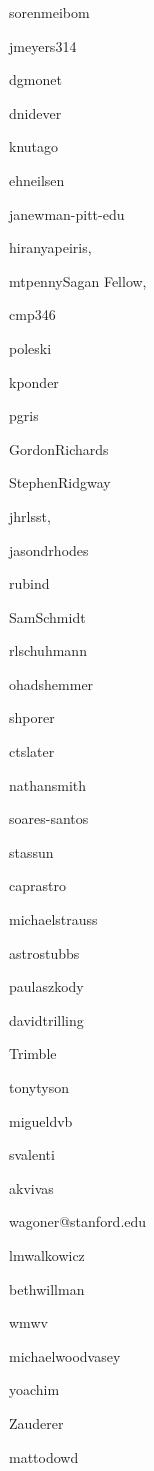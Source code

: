 \author{S{\o}ren Meibom}{sorenmeibom}{\cfa}
\author{Josh Meyers}{jmeyers314}{\stanford}
\author{Dave Monet}{dgmonet}{\usno}
\author{David Nidever}{dnidever}{\lsst}
\author{Knut Olsen}{knutago}{\noao}
\author{Eric Neilsen}{ehneilsen}{\somewhere}
\author{Jeffrey Newman}{janewman-pitt-edu}{\pitt}
\author{Hiranya Peiris}{hiranyapeiris}{\ucl, \okc}
\author{Matthew T.\ Penny}{mtpenny}{Sagan Fellow,~\osu}
\author{Christina Peters}{cmp346}{\drexel}
\author{Rados{\l}aw Poleski}{poleski}{\osu}
\author{Kara Ponder}{kponder}{\pitt}
\author{Phillipe Gris}{pgris}{\lpc}
\author{Gordon Richards}{GordonRichards}{\drexel}
\author{Stephen Ridgway}{StephenRidgway}{\noao}
\author{Jeonghee Rho}{jhrlsst}{\seti, \sofia}
\author{Jason Rhodes}{jasondrhodes}{\jpl}
\author{David Rubin}{rubind}{\stsci}
\author{Samuel Schmidt}{SamSchmidt}{\ucd}
\author{Robert Schuhmann}{rlschuhmann}{\ucl}
\author{Ohad Shemmer}{ohadshemmer}{\unt}
\author{Avi Shporer}{shporer}{\jpl}
\author{Colin Slater}{ctslater}{\uw}
\author{Nathan Smith}{nathansmith}{\arizona}
\author{Marcelles Soares-Santos}{soares-santos}{\somewhere}
\author{Keivan Stassun}{stassun}{\vanderbilt}
\author{Jay Strader}{caprastro}{\msu}
\author{Michael Strauss}{michaelstrauss}{\princeton}
\author{Rachel Street}{}{\lcogt}
\author{Christopher Stubbs}{astrostubbs}{\harvard}
\author{Paula Szkody}{paulaszkody}{\uw}
\author{David Trilling}{davidtrilling}{\somewhere}
\author{Virginia Trimble}{Trimble}{\somewhere}
\author{Tony Tyson}{tonytyson}{\ucd}
\author{Miguel de Val-Borro}{migueldvb}{\princeton}
\author{Stefano Valenti}{svalenti}{\somewhere}
\author{Kathy Vivas}{akvivas}{\ctio}
\author{Robert Wagoner}{wagoner@stanford.edu}{\stanford}
\author{Lucianne Walkowicz}{lmwalkowicz}{\adler}
\author{Beth Willman}{bethwillman}{\lsst}
\author{Michael W. Wood-Vasey}{wmwv}{\pitt}
\author{Michael Wood-Vasey}{michaelwoodvasey}{\pitt}
\author{Peter Yoachim}{yoachim}{\somewhere}
\author{Bevin Ashley Zauderer}{Zauderer}{\nyu}
\author{Matt O'Dowd}{mattodowd}{\cuny}
